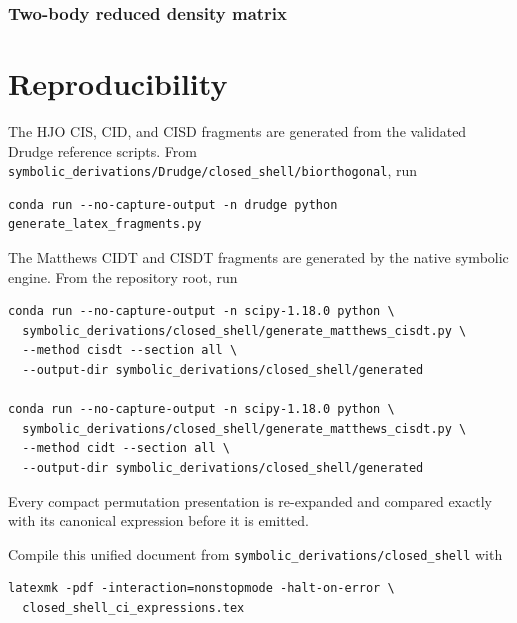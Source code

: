 \documentclass[10pt]{article}
\numberwithin{equation}{section}
\begin{document}
\subsubsection{Two-body reduced density matrix}
\begingroup
\scriptsize
\setlength{\jot}{1pt}

\endgroup

\clearpage
\appendix
\section{Reproducibility}

The HJO CIS, CID, and CISD fragments are generated from the validated Drudge
reference scripts.  From
\texttt{symbolic\_derivations/Drudge/closed\_shell/biorthogonal}, run
\begin{verbatim}
conda run --no-capture-output -n drudge python generate_latex_fragments.py
\end{verbatim}

The Matthews CIDT and CISDT fragments are generated by the native symbolic
engine.  From the repository root, run
\begin{verbatim}
conda run --no-capture-output -n scipy-1.18.0 python \
  symbolic_derivations/closed_shell/generate_matthews_cisdt.py \
  --method cisdt --section all \
  --output-dir symbolic_derivations/closed_shell/generated

conda run --no-capture-output -n scipy-1.18.0 python \
  symbolic_derivations/closed_shell/generate_matthews_cisdt.py \
  --method cidt --section all \
  --output-dir symbolic_derivations/closed_shell/generated
\end{verbatim}
Every compact permutation presentation is re-expanded and compared exactly
with its canonical expression before it is emitted.

Compile this unified document from
\texttt{symbolic\_derivations/closed\_shell} with
\begin{verbatim}
latexmk -pdf -interaction=nonstopmode -halt-on-error \
  closed_shell_ci_expressions.tex
\end{verbatim}
\end{document}
